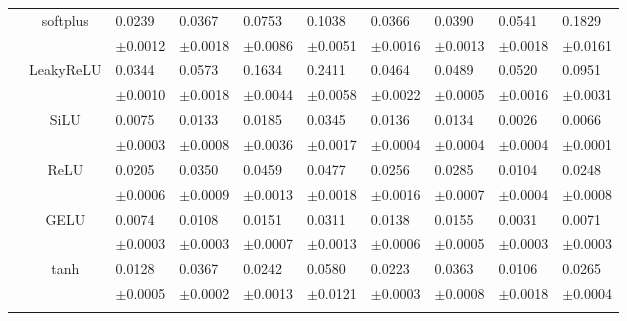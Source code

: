 \documentclass{article}
\begin{document}
\begin{table}[h!]
{\begin{tabularx}{\textwidth}{ccXXXXXXXX}
        & \multirow{2}{*}{softplus}
        & 0.0239 & 0.0367 & 0.0753 & 0.1038 & 0.0366 & 0.0390 & 0.0541 & 0.1829\\
        &&\scriptsize $\pm$0.0012 & \scriptsize $\pm$0.0018 & \scriptsize $\pm$0.0086 & \scriptsize $\pm$0.0051 & \scriptsize $\pm$0.0016 & \scriptsize $\pm$0.0013 & \scriptsize $\pm$0.0018 & \scriptsize $\pm$0.0161\\
        \cline{3-10}\rule{0pt}{2.3ex}

        & \multirow{2}{*}{LeakyReLU}
        & 0.0344 & 0.0573 & 0.1634 & 0.2411 & 0.0464 & 0.0489 & 0.0520 & 0.0951\\
        &&\scriptsize $\pm$0.0010 & \scriptsize $\pm$0.0018 & \scriptsize $\pm$0.0044 & \scriptsize $\pm$0.0058 & \scriptsize $\pm$0.0022 & \scriptsize $\pm$0.0005 & \scriptsize $\pm$0.0016 & \scriptsize $\pm$0.0031\\

        \hline\rule{0pt}{2.3ex}

        \multirow{14}{*}{$\textsf{MAE}_\textsf{symm}^{F}$} 
        & \multirow{2}{*}{SiLU}
        & 0.0075 & 0.0133 & 0.0185 & 0.0345 & 0.0136 & 0.0134 & 0.0026 & 0.0066\\
        &&\scriptsize $\pm$0.0003 & \scriptsize $\pm$0.0008 & \scriptsize $\pm$0.0036 & \scriptsize $\pm$0.0017 & \scriptsize $\pm$0.0004 & \scriptsize $\pm$0.0004 & \scriptsize $\pm$0.0004 & \scriptsize $\pm$0.0001\\
        \cline{3-10}\rule{0pt}{2.3ex}

        & \multirow{2}{*}{ReLU}
        & 0.0205 & 0.0350 & 0.0459 & 0.0477 & 0.0256 & 0.0285 & 0.0104 & 0.0248\\
        &&\scriptsize $\pm$0.0006 & \scriptsize $\pm$0.0009 & \scriptsize $\pm$0.0013 & \scriptsize $\pm$0.0018 & \scriptsize $\pm$0.0016 & \scriptsize $\pm$0.0007 & \scriptsize $\pm$0.0004 & \scriptsize $\pm$0.0008\\
        \cline{3-10}\rule{0pt}{2.3ex}

        & \multirow{2}{*}{GELU}
        & 0.0074 & 0.0108 & 0.0151 & 0.0311 & 0.0138 & 0.0155 & 0.0031 & 0.0071\\
        &&\scriptsize $\pm$0.0003 & \scriptsize $\pm$0.0003 & \scriptsize $\pm$0.0007 & \scriptsize $\pm$0.0013 & \scriptsize $\pm$0.0006 & \scriptsize $\pm$0.0005 & \scriptsize $\pm$0.0003 & \scriptsize $\pm$0.0003\\
        \cline{3-10}\rule{0pt}{2.3ex}

        & \multirow{2}{*}{tanh}
        & 0.0128 & 0.0367 & 0.0242 & 0.0580 & 0.0223 & 0.0363 & 0.0106 & 0.0265\\
        &&\scriptsize $\pm$0.0005 & \scriptsize $\pm$0.0002 & \scriptsize $\pm$0.0013 & \scriptsize $\pm$0.0121 & \scriptsize $\pm$0.0003 & \scriptsize $\pm$0.0008 & \scriptsize $\pm$0.0018 & \scriptsize $\pm$0.0004\\
        \cline{3-10}\rule{0pt}{2.3ex}


\end{tabularx}}
\end{table}
\end{document}
